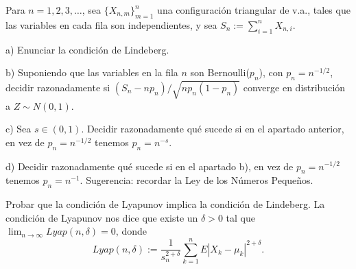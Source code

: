 \begin{problem}[11] Para $n=1, 2, 3, \dots$, sea  $\{X_{n, m}\}_{m=1}^{n}$  una configuraci\'on triangular de v.a., tales que las variables en cada fila son independientes, y sea $S_{n} := \sum_{i=1}^n X_{n, i}$.

a) Enunciar la condici\'on de Lindeberg.

b) Suponiendo que las variables en la fila $n$ son Bernoulli($p_n$), con
$p_n = n^{- 1/2}$,
decidir razonadamente
si 
$(S_n - n p_n)/\sqrt{n p_n (1 - p_n)}$ converge en distribuci\'on a $Z\sim N(0,1)$.

c) Sea $s \in (0,1)$. Decidir razonadamente qu\'e sucede si en el apartado anterior, en
vez de  $p_n = n^{ - 1/2}$ tenemos $p_n = n^{ - s}$.

d) Decidir razonadamente qu\'e sucede si en el apartado b), en
vez de  $p_n = n^{- 1/2}$ tenemos $p_n = n^{ - 1}$.
Sugerencia: recordar la Ley de los N\'umeros Peque\~nos.
\solution

\begin{expla}

\end{expla}

\end{problem}


\begin{problem}[12] Probar que la condici\'on de Lyapunov implica la condici\'on de Lindeberg. 
La condici\'on de Lyapunov nos dice que existe un $\delta > 0$ tal que
$\lim_{n\to \infty} Lyap(n, \delta) = 0$, donde 
$$
Lyap(n, \delta) := \frac{1}{s_n^{2 + \delta}} \sum_{k=1}^n  E|X_k - \mu_k|^{2 + \delta} .
$$
\solution

\begin{expla}

\end{expla}

\end{problem}







